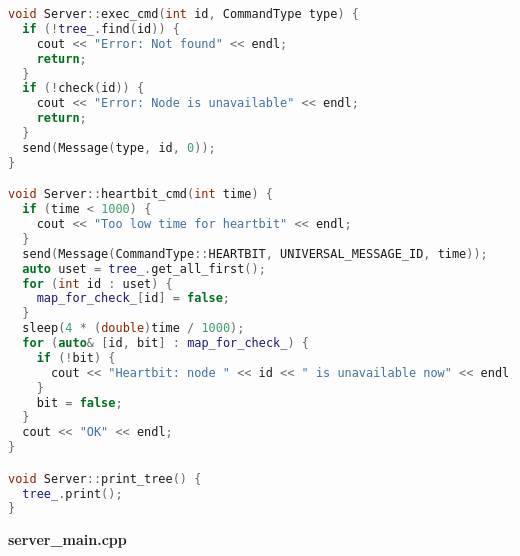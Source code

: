 \begin{lstlisting}[language=C++]
void Server::exec_cmd(int id, CommandType type) {
  if (!tree_.find(id)) {
    cout << "Error: Not found" << endl;
    return;
  }
  if (!check(id)) {
    cout << "Error: Node is unavailable" << endl;
    return;
  }
  send(Message(type, id, 0));
}

void Server::heartbit_cmd(int time) {
  if (time < 1000) {
    cout << "Too low time for heartbit" << endl;
  }
  send(Message(CommandType::HEARTBIT, UNIVERSAL_MESSAGE_ID, time));
  auto uset = tree_.get_all_first();
  for (int id : uset) {
    map_for_check_[id] = false;
  }
  sleep(4 * (double)time / 1000);
  for (auto& [id, bit] : map_for_check_) {
    if (!bit) {
      cout << "Heartbit: node " << id << " is unavailable now" << endl;
    }
    bit = false;
  }
  cout << "OK" << endl;
}

void Server::print_tree() {
  tree_.print();
}

\end{lstlisting}

\textbf{server\_main.cpp}

